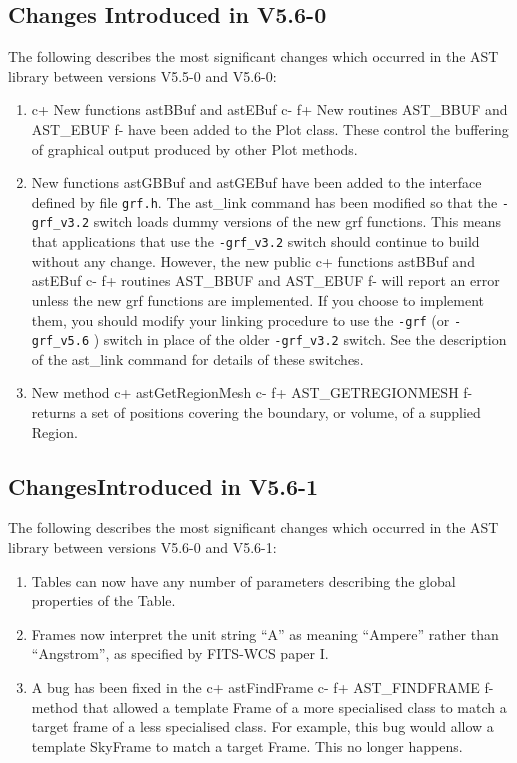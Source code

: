 \documentclass[twoside,11pt]{starlink}
\begin{document}
\subsection{Changes Introduced in V5.6-0}

The following describes the most significant changes which
occurred in the AST library between versions V5.5-0 and V5.6-0:

\begin{enumerate}

\item
c+
New functions astBBuf and astEBuf
c-
f+
New routines AST\_BBUF and AST\_EBUF
f-
have been added to the Plot class. These control the buffering of graphical
output produced by other Plot methods.

\item New functions astGBBuf and astGEBuf have been added to the interface
defined by file \verb+grf.h+. The ast\_link command has been modified so
that the \verb+-grf_v3.2+ switch loads dummy versions of the new grf
functions. This means that applications that use the  \verb+-grf_v3.2+
switch should continue to build without any change. However, the new public
c+
functions astBBuf and astEBuf
c-
f+
routines AST\_BBUF and AST\_EBUF
f-
will report an error unless the new grf functions are implemented. If you
choose to implement them, you should modify your linking procedure to
use the \verb+-grf+ (or  \verb+-grf_v5.6+ ) switch in place of the older
\verb+-grf_v3.2+ switch. See the description of the ast\_link command for
details of these switches.

\item New method
c+
astGetRegionMesh
c-
f+
AST\_GETREGIONMESH
f-
returns a set of positions covering the boundary, or volume, of a supplied
Region.

\end{enumerate}


\subsection{ChangesIntroduced in V5.6-1}

The following describes the most significant changes which
occurred in the AST library between versions V5.6-0 and V5.6-1:

\begin{enumerate}

\item Tables can now have any number of parameters describing the global
properties of the Table.

\item Frames now interpret the unit string ``A'' as meaning ``Ampere''
rather than ``Angstrom'', as specified by FITS-WCS paper I.

\item A bug has been fixed in the
c+
astFindFrame
c-
f+
AST\_FINDFRAME
f-
method that allowed a template Frame of a more specialised class to match
a target frame of a less specialised class. For example, this bug would
allow a template SkyFrame to match a target Frame. This no longer
happens.

\end{enumerate}
\end{document}
